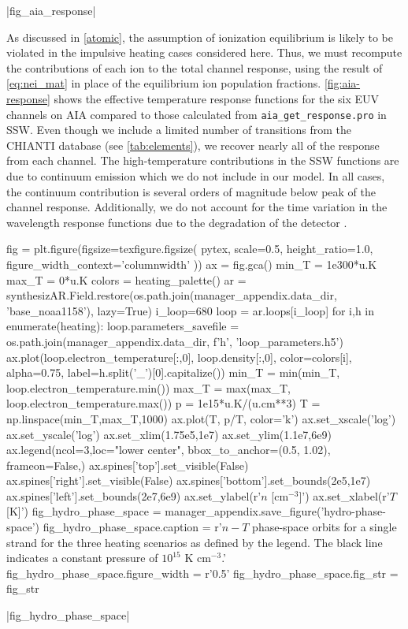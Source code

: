 |fig_aia_response|

As discussed in \autoref{atomic}, the assumption of ionization equilibrium is likely to be violated in the impulsive heating cases considered here. Thus, we must recompute the contributions of each ion to the total channel response, using the result of \autoref{eq:nei_mat} in place of the equilibrium ion population fractions. \autoref{fig:aia-response} shows the effective temperature response functions for the six EUV channels on AIA compared to those calculated from \texttt{aia\_get\_response.pro} in SSW. Even though we include a limited number of transitions from the CHIANTI database (see \autoref{tab:elements}), we recover nearly all of the response from each channel. The high-temperature contributions in the SSW functions are due to continuum emission which we do not include in our model. In all cases, the continuum contribution is several orders of magnitude below peak of the channel response. Additionally, we do not account for the time variation in the wavelength response functions due to the degradation of the detector \citep[see Section 2.1.6 of ][]{boerner_initial_2012}.

\begin{pycode}
fig = plt.figure(figsize=texfigure.figsize(
    pytex,
    scale=0.5,
    height_ratio=1.0, 
    figure_width_context='columnwidth'
))
ax = fig.gca()
min_T = 1e300*u.K
max_T = 0*u.K
colors = heating_palette()
ar = synthesizAR.Field.restore(os.path.join(manager_appendix.data_dir, 'base_noaa1158'), lazy=True)
i_loop=680
loop = ar.loops[i_loop]
for i,h in enumerate(heating):
    loop.parameters_savefile = os.path.join(manager_appendix.data_dir, f'{h}', 'loop_parameters.h5')
    ax.plot(loop.electron_temperature[:,0], loop.density[:,0], color=colors[i], alpha=0.75,
            label=h.split('_')[0].capitalize())
    min_T = min(min_T, loop.electron_temperature.min())
    max_T = max(max_T, loop.electron_temperature.max())
p = 1e15*u.K/(u.cm**3)
T = np.linspace(min_T,max_T,1000)
ax.plot(T, p/T, color='k')
ax.set_xscale('log')
ax.set_yscale('log')
ax.set_xlim(1.75e5,1e7)
ax.set_ylim(1.1e7,6e9)
ax.legend(ncol=3,loc="lower center", bbox_to_anchor=(0.5, 1.02), frameon=False,)
ax.spines['top'].set_visible(False)
ax.spines['right'].set_visible(False)
ax.spines['bottom'].set_bounds(2e5,1e7)
ax.spines['left'].set_bounds(2e7,6e9)
ax.set_ylabel(r'$n$ [cm$^{-3}$]')
ax.set_xlabel(r'$T$ [K]')
fig_hydro_phase_space = manager_appendix.save_figure('hydro-phase-space')
fig_hydro_phase_space.caption = r'$n-T$ phase-space orbits for a single strand for the three heating scenarios as defined by the legend. The black line indicates a constant pressure of $10^{15}$ K cm$^{-3}$.'
fig_hydro_phase_space.figure_width = r'0.5\columnwidth'
fig_hydro_phase_space.fig_str = fig_str
\end{pycode}
|fig_hydro_phase_space|


